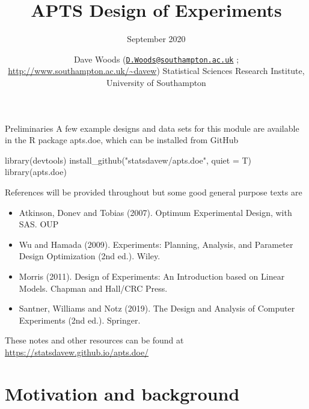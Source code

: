 \documentclass[
  ignorenonframetext,
]{beamer}
\title{APTS Design of Experiments}
\subtitle{September 2020}
\author{Dave Woods
(\href{mailto:D.Woods@southampton.ac.uk}{\nolinkurl{D.Woods@southampton.ac.uk}}
; \url{http://www.southampton.ac.uk/~davew}) Statistical Sciences
Research Institute, University of Southampton}
\date{}
\newenvironment{Shaded}{\begin{snugshade}}{\end{snugshade}}
\newcommand{\AttributeTok}[1]{\textcolor[rgb]{0.77,0.63,0.00}{#1}}
\newcommand{\FunctionTok}[1]{\textcolor[rgb]{0.00,0.00,0.00}{#1}}
\newcommand{\NormalTok}[1]{#1}
\newcommand{\StringTok}[1]{\textcolor[rgb]{0.31,0.60,0.02}{#1}}
\providecommand{\tightlist}{%
  \setlength{\itemsep}{0pt}\setlength{\parskip}{0pt}}
\begin{document}
\frame{\titlepage}

\begin{frame}
\newcommand{\bx}{\boldsymbol{x}}
\newcommand{\btheta}{\boldsymbol{\theta}}
\newcommand{\bbeta}{\boldsymbol{\beta}}
\newcommand{\bomega}{\boldsymbol{\omega}}
\newcommand{\bvarepsilon}{\boldsymbol{\varepsilon}}
\newcommand{\by}{\boldsymbol{y}}
\newcommand{\rT}{\mathrm{T}}
\newcommand{\Var}{\operatorname{Var}}
\newcommand{\bY}{\boldsymbol{Y}}
\newcommand{\beff}{\boldsymbol{f}}
\newcommand{\bphi}{\boldsymbol{\phi}}
\newcommand{\bg}{\boldsymbol{g}}
\newcommand{\bkappa}{\boldsymbol{\kappa}}
\newcommand{\be}{\boldsymbol{e}}
\end{frame}

\begin{frame}[fragile]{Preliminaries}
\protect\hypertarget{preliminaries}{}
A few example designs and data sets for this module are available in the
R package apts.doe, which can be installed from GitHub

\begin{Shaded}
\begin{Highlighting}[]
\FunctionTok{library}\NormalTok{(devtools)}
\FunctionTok{install\_github}\NormalTok{(}\StringTok{"statsdavew/apts.doe"}\NormalTok{, }\AttributeTok{quiet =}\NormalTok{ T)}
\FunctionTok{library}\NormalTok{(apts.doe)}
\end{Highlighting}
\end{Shaded}

References will be provided throughout but some good general purpose
texts are

\begin{itemize}
\tightlist
\item
  Atkinson, Donev and Tobias (2007). Optimum Experimental Design, with
  SAS. OUP
\item
  Wu and Hamada (2009). Experiments: Planning, Analysis, and Parameter
  Design Optimization (2nd ed.). Wiley.
\item
  Morris (2011). Design of Experiments: An Introduction based on Linear
  Models. Chapman and Hall/CRC Press.
\item
  Santner, Williams and Notz (2019). The Design and Analysis of Computer
  Experiments (2nd ed.). Springer.
\end{itemize}

These notes and other resources can be found at
\url{https://statsdavew.github.io/apts.doe/}
\end{frame}

\hypertarget{motivation-and-background}{%
\section{Motivation and background}\label{motivation-and-background}}
\end{document}
